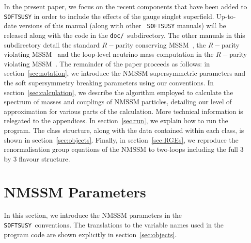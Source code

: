 \documentclass[final,3p,times]{elsarticle}
\def\SOFTSUSY{{\tt SOFTSUSY}}
\begin{document}
In the present paper, we focus on the recent components that have been added to
{\tt SOFTSUSY} in order to include the effects of the gauge singlet
superfield. Up-to-date versions of this manual (along with other {\tt
  SOFTSUSY} manuals) 
will be released along with the
code in the {\tt doc/}~subdirectory. The other manuals in this subdirectory detail the standard
$R-$parity conserving MSSM~\cite{Allanach:2001kg}, 
the $R-$parity violating MSSM~\cite{Allanach:2009bv} and the loop-level
neutrino mass 
computation in the $R-$parity violating MSSM~\cite{Allanach:2011de}.
The remainder of the paper proceeds as follows: in section~\ref{sec:notation}, we
introduce the NMSSM supersymmetric parameters and the soft supersymmetry
breaking 
parameters using our conventions.  In section~\ref{sec:calculation}, we describe
the algorithm 
employed to calculate the spectrum of masses and couplings of NMSSM
particles, detailing our level of approximation for various parts of the
calculation. More technical information is relegated to the appendices. In
section~\ref{sec:run}, we explain how to run the program. The class structure,
along with the data contained within each class, is shown in
section~\ref{sec:objects}. Finally, in section~\ref{sec:RGEs}, we reproduce
the renormalisation group equations of the NMSSM to two-loops including the
full 3 by 3 flavour structure. 

\section{NMSSM Parameters \label{sec:notation}}

In this section, we introduce the NMSSM parameters
in the \SOFTSUSY~conventions. The translations to the variable
names used in the program code are shown explicitly in
section~\ref{sec:objects}.  
\end{document}
